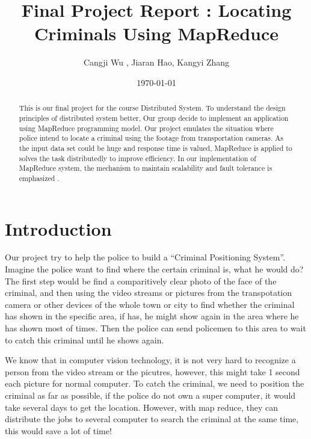 \documentclass[12pt]{article}
\begin{document}
\title{Final Project Report : Locating Criminals Using MapReduce}
\author{Cangji Wu , Jiaran Hao, Kangyi Zhang}
\date{\today}
\maketitle

\begin{abstract}
This is our final project for the course Distributed System. To understand the design principles
of distributed system better, Our group decide to implement an application using MapReduce programming model. 
Our project emulates the situation where police intend to locate a criminal using the footage from transportation cameras. 
As the input data set could be huge and response time is valued, MapReduce is applied to solves the task distributedly to
improve efficiency. In our implementation of MapReduce system, the mechanism to maintain scalability and fault tolerance is emphasized
. 
\end{abstract} 

\section {Introduction}

Our project try to help the police to build a “Criminal Positioning System”. Imagine the police want to find where the certain criminal is, what he would do?
The first step would be find a comparitively clear photo of the face of the criminal, and then using the video streams or pictures from the transpotation camera or other devices of the whole town or city to find whether the criminal has shown in the specific area, if has, he might show again in the area where he has shown most of times. Then the police can send policemen to this area to wait to catch this criminal until he shows again.

We know that in computer vision technology, it is not very hard to recognize a person from the video stream or the picutres, however, this might take 1 second each picture for normal computer. To catch the criminal, we need to position the criminal as far as possible, if the police do not own a super computer, it would take several days to get the location. However, with map reduce, they can distribute the jobs to several computer to search the criminal at the same time, this would save a lot of time!
\end{document}
